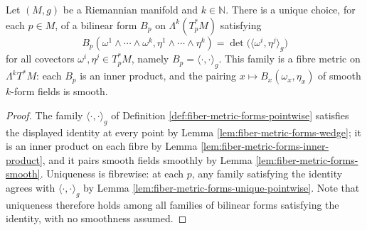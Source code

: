 \begin{proposition}
\label{prop:fiber-metric-forms}
\leanok
{}
Let $(M,g)$ be a Riemannian manifold and $k \in \mathbb{N}$. There is a unique choice, for each $p \in M$, of a bilinear form $B_p$ on $\Lambda^k(T_p^*M)$ satisfying
\[
B_p(\omega^1 \wedge \cdots \wedge \omega^k, \eta^1 \wedge \cdots \wedge \eta^k) = \det\big(\langle \omega^i, \eta^j \rangle_g\big)
\]
for all covectors $\omega^i, \eta^j \in T_p^*M$, namely $B_p = \langle \cdot, \cdot \rangle_g$. This family is a fibre metric on $\Lambda^k T^*M$: each $B_p$ is an inner product, and the pairing $x \mapsto B_x(\omega_x, \eta_x)$ of smooth $k$-form fields is smooth.
\end{proposition}
\begin{proof}
\leanok
{}
The family $\langle \cdot, \cdot \rangle_g$ of Definition \ref{def:fiber-metric-forms-pointwise} satisfies the displayed identity at every point by Lemma \ref{lem:fiber-metric-forms-wedge}; it is an inner product on each fibre by Lemma \ref{lem:fiber-metric-forms-inner-product}, and it pairs smooth fields smoothly by Lemma \ref{lem:fiber-metric-forms-smooth}. Uniqueness is fibrewise: at each $p$, any family satisfying the identity agrees with $\langle \cdot, \cdot \rangle_g$ by Lemma \ref{lem:fiber-metric-forms-unique-pointwise}. Note that uniqueness therefore holds among all families of bilinear forms satisfying the identity, with no smoothness assumed.
\end{proof}

